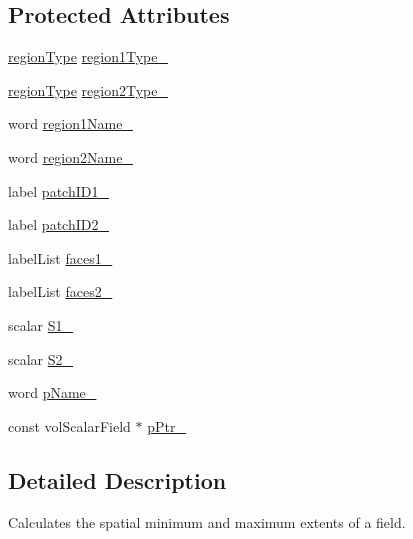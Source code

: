 \subsection*{Protected Attributes}
\begin{DoxyCompactItemize}
\item 
\hyperlink{classFoam_1_1functionObjects_1_1pressureDrop_a2c25b4a3d851e2d45d7a435a73598323}{region\+Type} \hyperlink{classFoam_1_1functionObjects_1_1pressureDrop_a80a66cc407a5d94c74f3718d56ea4b5b}{region1\+Type\+\_\+}
\item 
\hyperlink{classFoam_1_1functionObjects_1_1pressureDrop_a2c25b4a3d851e2d45d7a435a73598323}{region\+Type} \hyperlink{classFoam_1_1functionObjects_1_1pressureDrop_a78c045f115ef05b1f5d4d89f83c754d3}{region2\+Type\+\_\+}
\item 
word \hyperlink{classFoam_1_1functionObjects_1_1pressureDrop_a75895a060fc5f52e700cd6718938c48b}{region1\+Name\+\_\+}
\item 
word \hyperlink{classFoam_1_1functionObjects_1_1pressureDrop_ab8dca0ff9079a4f78a68a753935bc6cf}{region2\+Name\+\_\+}
\item 
label \hyperlink{classFoam_1_1functionObjects_1_1pressureDrop_a95ff96fa64b6a58c48f68f346c35eaf3}{patch\+I\+D1\+\_\+}
\item 
label \hyperlink{classFoam_1_1functionObjects_1_1pressureDrop_a15d73ca4d2c0aed50a48133b06ce5b03}{patch\+I\+D2\+\_\+}
\item 
label\+List \hyperlink{classFoam_1_1functionObjects_1_1pressureDrop_a49b2babfb438af2fff9311d0fe60b8a2}{faces1\+\_\+}
\item 
label\+List \hyperlink{classFoam_1_1functionObjects_1_1pressureDrop_a57b4b9fe9a46c5856eaad5e5ae6038fa}{faces2\+\_\+}
\item 
scalar \hyperlink{classFoam_1_1functionObjects_1_1pressureDrop_adc295432188050c24051a2e2dbd825a9}{S1\+\_\+}
\item 
scalar \hyperlink{classFoam_1_1functionObjects_1_1pressureDrop_a9c33d2fa1b42ea06846b9e71a9a7881f}{S2\+\_\+}
\item 
word \hyperlink{classFoam_1_1functionObjects_1_1pressureDrop_a0c19d97efb38c13265d9631f25767b36}{p\+Name\+\_\+}
\item 
const vol\+Scalar\+Field $\ast$ \hyperlink{classFoam_1_1functionObjects_1_1pressureDrop_a1d88f9fab57e2981aec827b26b5f9518}{p\+Ptr\+\_\+}
\end{DoxyCompactItemize}


\subsection{Detailed Description}
Calculates the spatial minimum and maximum extents of a field. 

